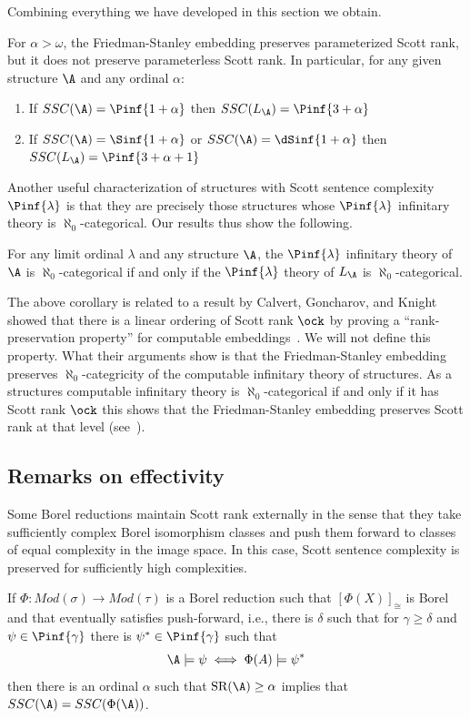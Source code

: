 \documentclass{amsart}
\begin{document}
Combining everything we have developed in this section we obtain.
\begin{theorem}\label{thm:fsandscottrank}
   For $\alpha>\omega$, the Friedman-Stanley embedding preserves parameterized
   Scott rank, but it does not preserve parameterless Scott rank. In particular,
   for any given structure $\A$ and any ordinal $\alpha$:
   \begin{enumerate}
      \tightlist
      \item If $SSC(\A)=\Pinf{1+\alpha}$ then $SSC(L_\A)=\Pinf{3+\alpha}$
      \item If $SSC(\A)=\Sinf{1+\alpha}$ or $SSC(\A)=\dSinf{1+\alpha}$ then 
      $SSC(L_\A)=\Pinf{3+\alpha+1}$
   \end{enumerate}
\end{theorem}
Another useful characterization of structures with Scott sentence complexity
$\Pinf{\lambda}$ is that they are precisely those structures whose
$\Pinf{\lambda}$ infinitary theory is $\aleph_0$-categorical. Our results thus
show the following.
\begin{corollary}
   For any limit ordinal $\lambda$ and any structure $\A$, the $\Pinf{\lambda}$
   infinitary theory of $\A$ is $\aleph_0$-categorical if and only if the
   $\Pinf{\lambda}$ theory of $L_\A$ is $\aleph_0$-categorical.
\end{corollary}
The above corollary is related to a result by Calvert, Goncharov, and Knight
showed that there is a linear ordering of Scott rank $\ock$ by proving a
``rank-preservation property'' for computable embeddings~\cite{calvert2007}. We
will not define this property. What their arguments show is that the
Friedman-Stanley embedding preserves $\aleph_0$-categricity of the computable
infinitary theory of structures. As a structures computable infinitary theory is
$\aleph_0$-categorical if and only if it has Scott rank $\ock$ this shows that
the Friedman-Stanley embedding preserves Scott rank at that level
(see~\cite{alvir2021}).
\subsection{Remarks on effectivity}
Some Borel reductions maintain Scott rank externally in the sense that they take sufficiently complex Borel isomorphism classes and push them forward to classes of equal complexity in the image space.
In this case, Scott sentence complexity is preserved for sufficiently high
complexities.

\begin{proposition}\label{prop:push-forwardssc}
   If $\Phi:Mod(\sigma)\to Mod(\tau)$ is a Borel reduction such that
   $[\Phi(X)]_{\cong}$ is Borel and that eventually satisfies push-forward, i.e.,
   there is $\delta$ such that for $\gamma\geq\delta$ and
   $\psi\in\Pinf{\gamma}$ there is $\psi^*\in\Pinf{\gamma}$ such that
   $$\A\models \psi \iff \Phi(A)\models\psi^*$$
   then there is an ordinal $\alpha$ such that $\text{SR}(\A)\geq\alpha$ implies
   that $SSC(\A)=SSC(\Phi(\A))$.
\end{proposition}
\end{document}
